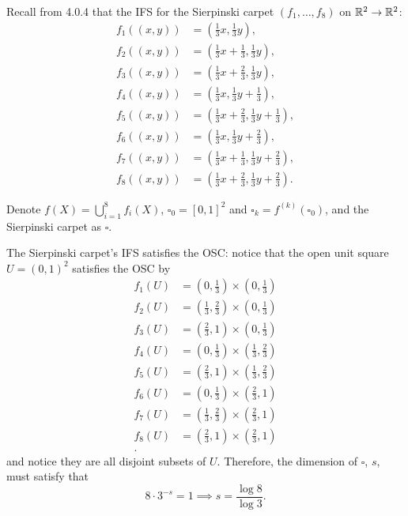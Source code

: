 Recall from 4.0.4 that the IFS for the Sierpinski carpet \((f_1, \ldots, f_8)\) on \(\mathbb{R}^2 \to \mathbb{R}^2\):
\begin{align*}
    f_1((x, y)) &= \left(\frac{1}{3}x, \frac{1}{3}y\right),\\
    f_2((x, y)) &= \left(\frac{1}{3}x + \frac{1}{3}, \frac{1}{3}y\right),\\
    f_3((x, y)) &= \left(\frac{1}{3}x + \frac{2}{3}, \frac{1}{3}y\right),\\
    f_4((x, y)) &= \left(\frac{1}{3}x, \frac{1}{3}y + \frac{1}{3}\right),\\
    f_5((x, y)) &= \left(\frac{1}{3}x + \frac{2}{3}, \frac{1}{3}y + \frac{1}{3}\right),\\
    f_6((x, y)) &= \left(\frac{1}{3}x, \frac{1}{3}y + \frac{2}{3}\right),\\
    f_7((x, y)) &= \left(\frac{1}{3}x + \frac{1}{3}, \frac{1}{3}y  + \frac{2}{3}\right),\\
    f_8((x, y)) &= \left(\frac{1}{3}x + \frac{2}{3}, \frac{1}{3}y  + \frac{2}{3}\right).
\end{align*}

Denote \(f(X) = \bigcup_{i = 1}^{8} f_i(X)\), \(\square_0 = [0, 1]^2\) and \(\square_k = f^{(k)}(\square_0)\), and the Sierpinski carpet as \(\square\).

The Sierpinski carpet's IFS satisfies the OSC: notice that the open unit square \(U = (0, 1)^2\) satisfies the OSC by
\begin{align*}
    f_1(U) &= \left(0, \frac{1}{3}\right) \times \left(0, \frac{1}{3}\right)\\
    f_2(U) &= \left(\frac{1}{3}, \frac{2}{3}\right) \times \left(0, \frac{1}{3}\right)\\
    f_3(U) &= \left(\frac{2}{3}, 1\right) \times \left(0, \frac{1}{3}\right)\\
    f_4(U) &= \left(0, \frac{1}{3}\right) \times \left(\frac{1}{3}, \frac{2}{3}\right)\\
    f_5(U) &= \left(\frac{2}{3}, 1\right) \times \left(\frac{1}{3}, \frac{2}{3}\right)\\
    f_6(U) &= \left(0, \frac{1}{3}\right) \times \left(\frac{2}{3}, 1\right)\\
    f_7(U) &= \left(\frac{1}{3}, \frac{2}{3}\right) \times \left(\frac{2}{3}, 1\right)\\
    f_8(U) &= \left(\frac{2}{3}, 1\right) \times \left(\frac{2}{3}, 1\right)\\.
\end{align*}
and notice they are all disjoint subsets of \(U\). Therefore, the dimension of \(\square\), \(s\), must satisfy that
\[
8 \cdot 3^{-s} = 1 \implies s = \frac{\log 8}{\log 3}.
\]


